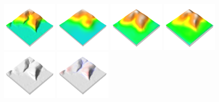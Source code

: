 \documentclass[prodmode,acmtochi]{acmsmall} %
\begin{document}
\begin{figure}[h!]
\begin{center}
		\includegraphics[width=0.24\textwidth]{images/render_3d/dem_1.png}
		\includegraphics[width=0.24\textwidth]{images/render_3d/mean_dem_1.png}
		\includegraphics[width=0.24\textwidth]{images/render_3d/mean_dem_2.png}
		\includegraphics[width=0.24\textwidth]{images/render_3d/mean_dem_3.png}
		\includegraphics[width=0.24\textwidth]{images/render_3d/dem_difference_1.png}
		\includegraphics[width=0.24\textwidth]{images/render_3d/mean_dem_regression_difference_1.png}

\end{center}
\end{figure}
\end{document}
